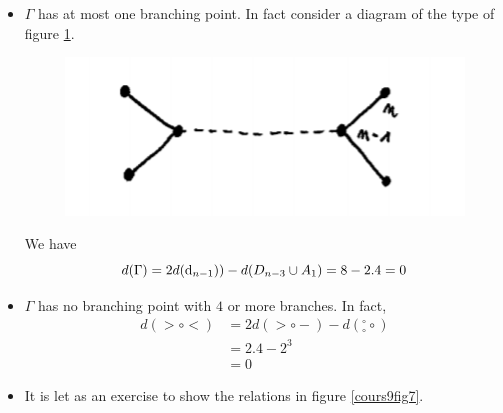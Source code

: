 \documentclass[envcountsame,envcountchap]{svmono}
\begin{document}
\begin{itemize}
\item $\Gamma$ has at most one branching point. In fact consider a diagram of the type of figure \ref{cours9fig6}.

\begin{figure}[h!]
\centering
\includegraphics[scale=0.6]{cours9fig6.png}
\caption{}
\label{cours9fig6}
\end{figure}    

We have
\begin{equation}
d(\Gamma) = 2 d(\mathrm{d}_{n-1})) - d (D_{n-3} \cup A_1 ) = 8 - 2.4 = 0
\end{equation}

\item $\Gamma$ has no branching point with $4$ or more branches. In fact,
\begin{equation}
\begin{split}
d(>\circ < ) &= 2 d (>\circ - ) - d ({}_\circ^\circ \circ) \\
&= 2 . 4 - 2^3 \\
&=0
\end{split}
\end{equation}

\item It is let as an exercise to show the relations in figure \ref{cours9fig7}.


\end{itemize}
\end{document}
